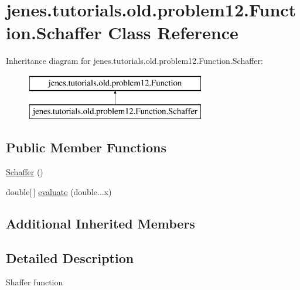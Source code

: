 \hypertarget{classjenes_1_1tutorials_1_1old_1_1problem12_1_1_function_1_1_schaffer}{\section{jenes.\-tutorials.\-old.\-problem12.\-Function.\-Schaffer Class Reference}
\label{classjenes_1_1tutorials_1_1old_1_1problem12_1_1_function_1_1_schaffer}
}
Inheritance diagram for jenes.\-tutorials.\-old.\-problem12.\-Function.\-Schaffer\-:\begin{figure}[H]
\begin{center}
\leavevmode
\includegraphics[height=2.000000cm]{classjenes_1_1tutorials_1_1old_1_1problem12_1_1_function_1_1_schaffer}
\end{center}
\end{figure}
\subsection*{Public Member Functions}
\begin{DoxyCompactItemize}
\item 
\hyperlink{classjenes_1_1tutorials_1_1old_1_1problem12_1_1_function_1_1_schaffer_ac632a384bd3db03bf007f92ea5e29f58}{Schaffer} ()
\item 
double\mbox{[}$\,$\mbox{]} \hyperlink{classjenes_1_1tutorials_1_1old_1_1problem12_1_1_function_1_1_schaffer_a1443f5f3a7da74a3f3d4552b63b9e12d}{evaluate} (double...\-x)
\end{DoxyCompactItemize}
\subsection*{Additional Inherited Members}


\subsection{Detailed Description}
Shaffer function 

